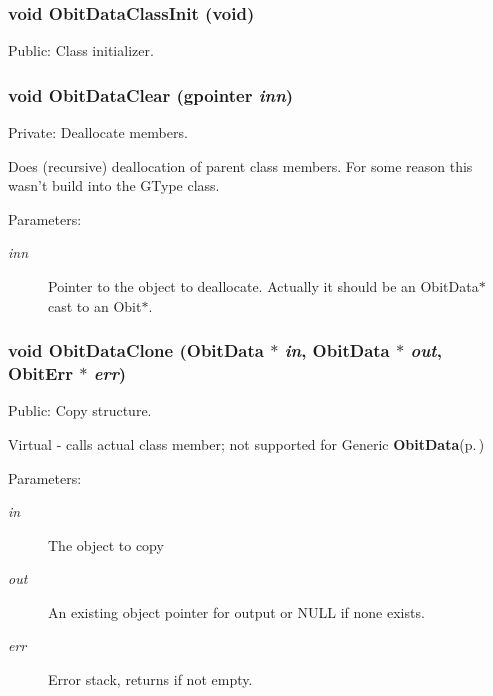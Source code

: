 \subsubsection{\setlength{\rightskip}{0pt plus 5cm}void Obit\-Data\-Class\-Init (void)}\label{ObitData_8c_a31}


Public: Class initializer. 

\subsubsection{\setlength{\rightskip}{0pt plus 5cm}void Obit\-Data\-Clear (gpointer {\em inn})}\label{ObitData_8c_a5}


Private: Deallocate members. 

Does (recursive) deallocation of parent class members. For some reason this wasn't build into the GType class. \begin{Desc}
\item[Parameters:]
\begin{description}
\item[{\em inn}]Pointer to the object to deallocate. Actually it should be an Obit\-Data$\ast$ cast to an Obit$\ast$. \end{description}
\end{Desc}
\subsubsection{\setlength{\rightskip}{0pt plus 5cm}void Obit\-Data\-Clone ({\bf Obit\-Data} $\ast$ {\em in}, {\bf Obit\-Data} $\ast$ {\em out}, {\bf Obit\-Err} $\ast$ {\em err})}\label{ObitData_8c_a15}


Public: Copy structure. 

Virtual - calls actual class member; not supported for Generic {\bf Obit\-Data}{\rm (p.\,\pageref{structObitData})} \begin{Desc}
\item[Parameters:]
\begin{description}
\item[{\em in}]The object to copy \item[{\em out}]An existing object pointer for output or NULL if none exists. \item[{\em err}]Error stack, returns if not empty. \end{description}
\end{Desc}
